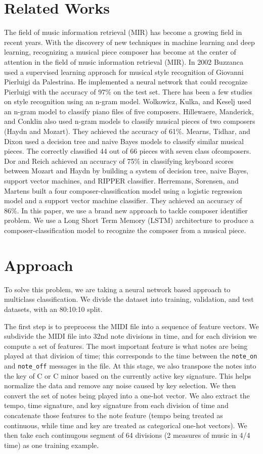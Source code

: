 \documentclass[11pt,a4paper]{article}
\begin{document}
\section{Related Works}
The field of music information retrieval (MIR) has become a growing field in recent years. 
With the discovery of new techniques in machine learning and deep learning, recognizing a musical piece composer has become at the center of attention in the field of music information retrieval (MIR). In 2002 Buzzanca \cite{Buzz} used a supervised learning approach for musical style recognition of Giovanni Pierluigi da Palestrina. He implemented a neural network that could recognize Pierluigi with the accuracy of 97\% on the test set. There has been a few studies on style recognition using an n-gram model. Wolkowicz, Kulka, and Keselj \cite{n-gram} used an n-gram model to classify piano files of five composers.  Hillewaere, Manderick, and Conklin \cite{Hillewaere} also used n-gram models to classify musical pieces of two composers (Haydn and Mozart). They achieved the accuracy of 61\%. 
Mearns, Tidhar, and Dixon \cite{Mearns} used a decision tree and naive Bayes models to classify similar musical pieces. The correctly classified 44 out of 66 pieces with seven class ofcomposers. Dor and Reich \cite{Dor} achieved an accuracy of 75\% in classifying keyboard scores between Mozart and Haydn by building a system of decision tree, naive Bayes, support vector machines, and RIPPER classifier.
Herremans, Sorensen, and Martens built a four composer-classification model using a logistic regression model and a support vector machine classifier. They achieved an accuracy of 86\%. 
In this paper, we use a brand new approach to tackle composer identifier problem. We use a Long Short Term Memory (LSTM) architecture to produce a composer-classification model to recognize the composer from a musical piece. 

\section{Approach}
To solve this problem, we are taking a neural network based approach to multiclass classification. We divide the dataset into training, validation, and test datasets, with an 80:10:10 split.

The first step is to preprocess the MIDI file into a sequence of feature vectors. We subdivide the MIDI file into 32nd note divisions in time, and for each division we compute a set of features. The most important feature is what notes are being played at that division of time; this corresponds to the time between the \texttt{note_on} and \texttt{note_off} messages in the file. At this stage, we also transpose the notes into the key of C or C minor based on the currently active key signature. This helps normalize the data and remove any noise caused by key selection. We then convert the set of notes being played into a one-hot vector. We also extract the tempo, time signature, and key signature from each division of time and concatenate those features to the note feature (tempo being treated as continuous, while time and key are treated as categorical one-hot vectors). We then take each continugous segment of 64 divisions (2 measures of music in 4/4 time) as one training example.
\end{document}
